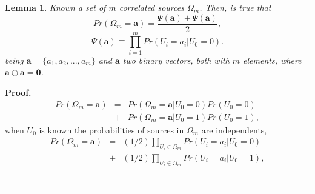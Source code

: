 \documentclass[journal]{IEEEtran}
\newtheorem{lemma}[theorem]{Lemma}
\newenvironment{proof}[1][Proof]{\textbf{#1.} }{\ \rule{0.5em}{0.5em}}
\begin{document}
\begin{lemma}
 \label{lemm:PrA}
Known a set of $m$ correlated  sources  $\Omega_m$. Then, is true that
\begin{equation}\label{eq:PA}
Pr(\Omega_m=\mathbf{a})=\frac{ \Psi(\mathbf{a}) + \Psi(\mathbf{\bar{a}}) }{2},
\end{equation}
\begin{equation}\label{eq:PAequiv}
\Psi(\mathbf{a}) \equiv \prod \limits_{i=1}^{m}{Pr(U_i=a_i|U_0=0)}.
\end{equation}
being $\mathbf{a}=\{a_1, a_2, ..., a_m\}$ and $\mathbf{\bar{a}}$ two 
binary vectors, both with $m$ elements, where $\mathbf{\bar{a}}\oplus \mathbf{a}=\mathbf{0}$. 
\end{lemma}
\begin{proof}
 \label{proof:PrA} 
\begin{equation}\label{eq:PA1}
\begin{matrix}
Pr(\Omega_m=\mathbf{a})&=&Pr(\Omega_m=\mathbf{a}|U_0=0)Pr(U_0=0)\\
~                 &+&Pr(\Omega_m=\mathbf{a}|U_0=1)Pr(U_0=1), 
\end{matrix}
\end{equation}
when $U_0$ is known the probabilities of sources in $\Omega_m$ are independents,
\begin{equation}\label{eq:PA3}
\begin{matrix}
Pr(\Omega_m=\mathbf{a})&=&(1/2)\prod \limits_{U_i\in \Omega_m}{Pr(U_i=a_i|U_0=0)}\\
~                      &+&(1/2)\prod \limits_{U_i\in \Omega_m}{Pr(U_i=a_i|U_0=1)}, 
\end{matrix}
\end{equation}
\end{proof}
\end{document}
